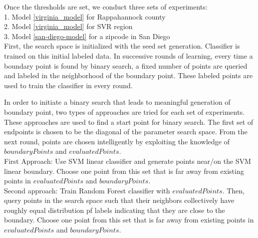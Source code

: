 Once the thresholds are set, we conduct three sets of experiments:\\
1. Model \ref{virginia_model} for Rappahannock county\\
2. Model \ref{virginia_model} for SVR region\\
3. Model \ref{san-diego-model} for a zipcode in San Diego\\
First, the search space is initialized with the seed set generation. Classifier is trained on this initial labeled data.
In successive rounds of learning, every time a boundary point is found by binary search, a fixed number of points are queried and labeled in the neighborhood of the boundary point. These labeled points are used to train the classifier in every round.

In order to initiate a binary search that leads to meaningful generation of boundary point, two types of approaches are tried for each set of experiments. These approaches are used to find a start point for binary search. The first set of endpoints is chosen to be the diagonal of the parameter search space. From the next round, points are chosen intelligently by exploiting the knowledge of $boundaryPoints$ and $evaluatedPoints$.\\
First Approach:
Use SVM linear classifier and generate points near/on the SVM linear boundary.
Choose one point from this set that is far away from existing points in $evaluatedPoints$ and $boundaryPoints$.\\
Second approach:
Train Random Forest classifier with $evaluatedPoints$. Then, query points in the search space such that their neighbors collectively have roughly equal distribution pf labels indicating that they are close to the boundary. Choose one point from this set that is far away from existing points in $evaluatedPoints$ and $boundaryPoints$.\\

